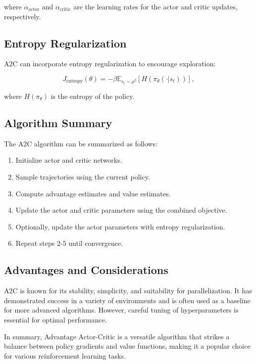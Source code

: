 \documentclass[conference]{IEEEtran}
\begin{document}
where $\alpha_{\text{actor}}$ and $\alpha_{\text{critic}}$ are the learning rates for the actor and critic updates, respectively.

\subsection{Entropy Regularization}

A2C can incorporate entropy regularization to encourage exploration:

\begin{equation}
J_{\text{entropy}}(\theta) = -\beta \mathbb{E}_{s_t \sim \rho^{\beta}} \left[ H(\pi_{\theta}(\cdot|s_t)) \right],
\end{equation}

where $H(\pi_{\theta})$ is the entropy of the policy.

\subsection{Algorithm Summary}

The A2C algorithm can be summarized as follows:

\begin{enumerate}
  \item Initialize actor and critic networks.
  \item Sample trajectories using the current policy.
  \item Compute advantage estimates and value estimates.
  \item Update the actor and critic parameters using the combined objective.
  \item Optionally, update the actor parameters with entropy regularization.
  \item Repeat steps 2-5 until convergence.
\end{enumerate}

\subsection{Advantages and Considerations}

A2C is known for its stability, simplicity, and suitability for parallelization. It has demonstrated success in a variety of environments and is often used as a baseline for more advanced algorithms. However, careful tuning of hyperparameters is essential for optimal performance.

In summary, Advantage Actor-Critic is a versatile algorithm that strikes a balance between policy gradients and value functions, making it a popular choice for various reinforcement learning tasks.
\end{document}
